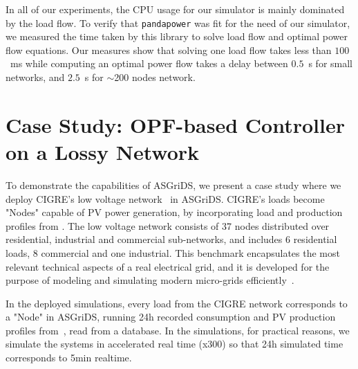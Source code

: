 \documentclass[conference]{IEEEtran}
\newcommand{\ignore}[1]{}
\begin{document}
In all of our experiments, the CPU usage for our simulator is mainly dominated by the load flow\ignore{solver that runs in an asynchronous while true loop (in order to be maintained up to date)}. To verify that \texttt{pandapower} was fit for the need of our simulator, we measured the time taken by this library to solve load flow and optimal power flow equations. Our measures show that solving one load flow takes less than $100$~ms while computing an optimal power flow takes a delay between $0.5$~s for small networks, and $2.5$~s for $\sim$200 nodes network.



\section{Case Study: OPF-based Controller on a Lossy Network}\label{case_study}
\label{sec:case_study}


To demonstrate the capabilities of ASGriDS, we present a case study where we deploy CIGRE's low voltage network~\cite{BenchmarkSystemsNetwork2011}\ignore{ depicted in Figure~\ref{cigre_lv}} in ASGriDS. CIGRE's loads become "Nodes" capable of PV power generation, by incorporating load and production profiles from \cite{espinosa2015dissemination}. The low voltage network consists of 37 nodes distributed over residential, industrial and commercial sub-networks, and includes 6 residential loads, 8 commercial and one industrial. This benchmark encapsulates the most relevant technical aspects of a real electrical grid, and it is developed for the purpose of modeling and simulating modern micro-grids efficiently~\cite{papathanassiouBENCHMARKLOWVOLTAGE}.

In the deployed simulations, every load from the CIGRE network corresponds to a "Node" in ASGriDS, running 24h recorded consumption and PV production profiles from~\cite{espinosa2015dissemination}, read from a database. In the simulations, for practical reasons, we simulate the systems in accelerated real time (x300) so that 24h simulated time corresponds to 5min realtime. 
\end{document}
